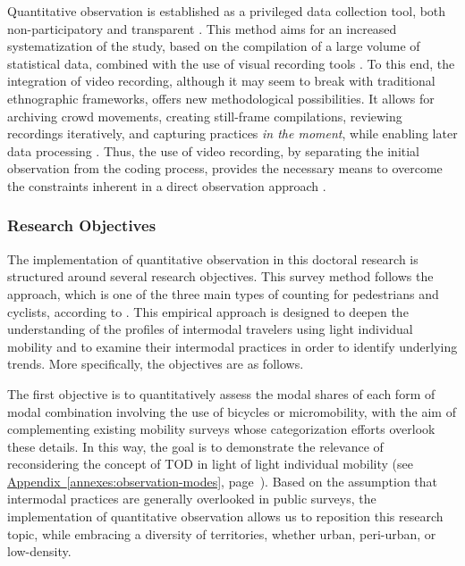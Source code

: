 \begin{refsegment}
Quantitative observation is established as a privileged data collection tool, both non-participatory and transparent \textcolor{blue}{\autocite[248]{paugam_enquete_2012}}. This method aims for an increased systematization of the study, based on the compilation of a large volume of statistical data, combined with the use of visual recording tools \textcolor{blue}{\autocite[42, 44]{filion_compter_2011}}. To this end, the integration of video recording, although it may seem to break with traditional ethnographic frameworks, offers new methodological possibilities. It allows for archiving crowd movements, creating still-frame compilations, reviewing recordings iteratively, and capturing practices \textsl{in the moment}, while enabling later data processing \textcolor{blue}{\autocite[131]{meyer_elements_2013}}. Thus, the use of video recording, by separating the initial observation from the coding process, provides the necessary means to overcome the constraints inherent in a direct observation approach \textcolor{blue}{\autocite[130]{peneff_mesure_1995}}.%

\subsubsection*{Research Objectives
    \label{chap3:objectifs-observation-quantitative}
    }

The implementation of quantitative observation in this doctoral research is structured around several research objectives. This survey method follows the  approach, which is one of the three main types of counting for pedestrians and cyclists, according to \textcolor{blue}{\textcite[4-20]{johnstone_collecting_2017}}. This empirical approach is designed to deepen the understanding of the profiles of intermodal travelers using light individual mobility and to examine their intermodal practices in order to identify underlying trends. More specifically, the objectives are as follows.%

The first objective is to quantitatively assess the modal shares of each form of modal combination involving the use of bicycles or micromobility, with the aim of complementing existing mobility surveys whose categorization efforts overlook these details. In this way, the goal is to demonstrate the relevance of reconsidering the concept of \acrfull{TOD} in light of light individual mobility (see \hyperref[annexes:observation-modes]{Appendix~\ref{annexes:observation-modes}}, page~\pageref{annexes:observation-modes}). Based on the assumption that intermodal practices are generally overlooked in public surveys, the implementation of quantitative observation allows us to reposition this research topic, while embracing a diversity of territories, whether urban, peri-urban, or low-density.%


\end{refsegment}
